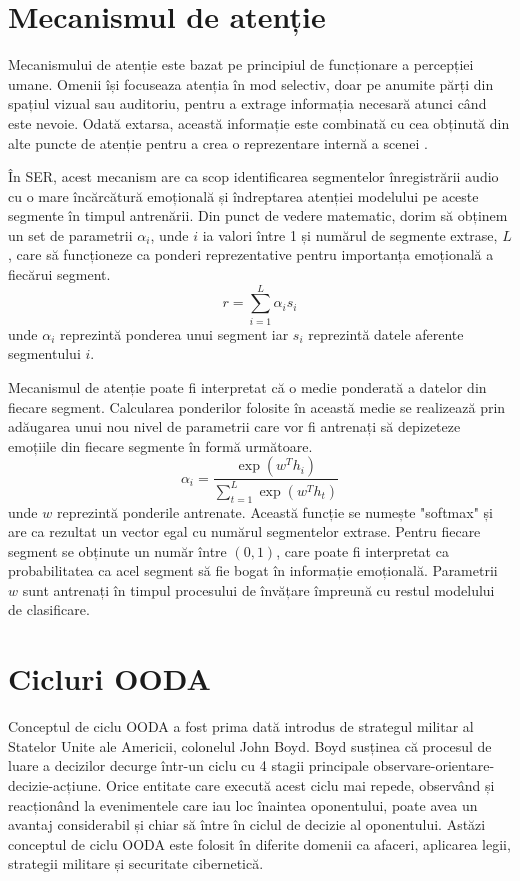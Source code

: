 \documentclass[a4paper,12pt]{book}
\begin{document}
				\section{Mecanismul de atenție} \label{attention}
				 Mecanismului de atenție este bazat  pe principiul de funcționare a percepției umane. Omenii  își focuseaza atenția în mod selectiv, doar pe anumite părți din spațiul vizual sau auditoriu, pentru a extrage informația necesară atunci când este nevoie. Odată extarsa, această informație este combinată cu cea obținută din alte puncte de atenție pentru a crea o reprezentare internă a scenei \cite{zhang, attention1}. \par
				 În SER, acest mecanism are ca scop identificarea segmentelor înregistrării audio cu o mare încărcătură emoțională și îndreptarea atenției modelului pe aceste segmente în timpul antrenării. Din punct de vedere matematic, dorim să obținem un set de parametrii $\alpha_i$, unde $i$ ia valori între 1 și numărul de segmente extrase, $L$, care să funcționeze ca ponderi reprezentative pentru importanța emoțională a fiecărui segment.
				\begin{equation}
					r = \sum_{i=1}^{L} \alpha_i s_i
				\end{equation}
				unde $\alpha_i$ reprezintă ponderea unui segment iar $s_i$ reprezintă datele aferente segmentului $i$. \par
				Mecanismul de atenție poate fi interpretat că o medie ponderată a datelor din fiecare segment. Calcularea ponderilor folosite în această medie se realizează prin adăugarea unui nou nivel de parametrii care vor fi antrenați să depizeteze emoțiile din fiecare segmente în formă următoare.
				\begin{equation} \label{softmax_form}
					\alpha_i = \frac{\exp(w^Th_i)}{\sum_{t=1}^{L} \exp(w^Th_t)}
				\end{equation}
				unde $w$ reprezintă ponderile antrenate.
				Această funcție se numește "softmax" și are ca rezultat un vector egal cu numărul segmentelor extrase. Pentru fiecare segment se obținute un număr între $(0, 1)$, care poate fi interpretat ca probabilitatea ca acel segment să fie bogat în informație emoțională.  Parametrii $w$ sunt antrenați în timpul procesului de învățare împreună cu restul modelului de clasificare.
			
				\section{Cicluri OODA} \label{ooda}
				 Conceptul de ciclu OODA a fost prima dată introdus de strategul militar al Statelor Unite ale Americii, colonelul John Boyd. Boyd susținea că procesul de luare a decizilor decurge într-un ciclu cu 4 stagii principale observare-orientare-decizie-acțiune. Orice entitate care execută acest ciclu mai repede, observând și reacționând la evenimentele care iau loc înaintea oponentului, poate avea un avantaj considerabil și chiar să între în ciclul de decizie al oponentului. Astăzi conceptul de ciclu OODA este folosit în diferite domenii ca afaceri, aplicarea legii, strategii militare și securitate cibernetică. \par
				 
\end{document}
